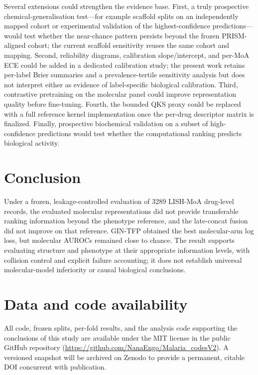 \documentclass[11pt,a4paper]{article}
\begin{document}
Several extensions could strengthen the evidence base. First, a truly prospective chemical-generalisation test---for example scaffold splits on an independently mapped cohort or experimental validation of the highest-confidence predictions---would test whether the near-chance pattern persists beyond the frozen PRISM-aligned cohort; the current scaffold sensitivity reuses the same cohort and mapping. Second, reliability diagrams, calibration slope/intercept, and per-MoA ECE could be added in a dedicated calibration study; the present work retains per-label Brier summaries and a prevalence-tertile sensitivity analysis but does not interpret either as evidence of label-specific biological calibration. Third, contrastive pretraining on the molecular panel could improve representation quality before fine-tuning. Fourth, the bounded QKS proxy could be replaced with a full reference kernel implementation once the per-drug descriptor matrix is finalized. Finally, prospective biochemical validation on a subset of high-confidence predictions would test whether the computational ranking predicts biological activity.

\section{Conclusion}

Under a frozen, leakage-controlled evaluation of \num{3289} LISH-MoA drug-level records, the evaluated molecular representations did not provide transferable ranking information beyond the phenotype reference, and the late-concat fusion did not improve on that reference. GIN-TFP obtained the best molecular-arm log loss, but molecular AUROCs remained close to chance. The result supports evaluating structure and phenotype at their appropriate information levels, with collision control and explicit failure accounting; it does not establish universal molecular-model inferiority or causal biological conclusions.

\section*{Data and code availability}

All code, frozen splits, per-fold results, and the analysis code supporting the conclusions of this study are available under the MIT license in the public GitHub repository (\url{https://github.com/NanaEngo/Malaria_codesV2}). A versioned snapshot will be archived on Zenodo to provide a permanent, citable DOI concurrent with publication.
\end{document}
